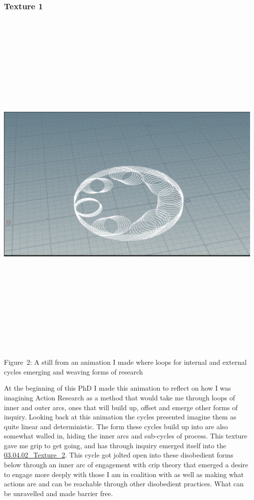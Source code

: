 \hypertarget{texture-1}{%
\subsubsection[Texture
1]{\texorpdfstring{\protect\hypertarget{anchor}{}{}Texture
1}{Texture 1}}\label{texture-1}}

\includegraphics[width=11.93056in,height=7.01389in]{./media_03_Disobedient_Action_Research_Cycles/Pictures/1.png}

Figure~2: A still from an animation I made where loops for internal and
external cycles emerging and weaving forms of research

At the beginning of this PhD I made this animation to reflect on how I
was imagining Action Research as a method that would take me through
loops of inner and outer arcs, ones that will build up, offset and
emerge other forms of inquiry. Looking back at this animation the cycles
presented imagine them as quite linear and deterministic. The form these
cycles build up into are also somewhat walled in, hiding the inner arcs
and sub-cycles of process. This texture gave me grip to get going, and
has through inquiry emerged itself into the
\href{03.04.02_Texture_2.md}{03.04.02\_Texture\_2}. This cycle got
jolted open into these disobedient forms below through an inner arc of
engagement with crip theory that emerged a desire to engage more deeply
with those I am in coalition with as well as making what actions are and
can be reachable through other disobedient practices. What can be
unravelled and made barrier free.

